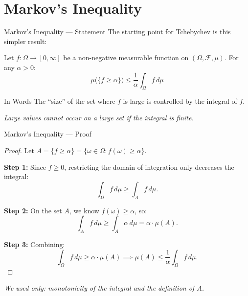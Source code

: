 \documentclass{beamer}
\begin{document}
\section{Markov's Inequality}

\begin{frame}{Markov's Inequality — Statement}
    The starting point for Tchebychev is this simpler result:

    \begin{theorem}
        Let $f: \Omega \to [0, \infty]$ be a non-negative measurable function on $(\Omega, \mathscr{F}, \mu)$. For any $\alpha > 0$:
        \[
            \boxed{\mu\big(\{f \geq \alpha\}\big) \leq \frac{1}{\alpha} \int_\Omega f \, d\mu}
        \]
    \end{theorem}

    \vspace{0.3cm}
    \begin{alertblock}{In Words}
        The ``size'' of the set where $f$ is large is controlled by the integral of $f$.

        \vspace{0.2cm}
        \textit{Large values cannot occur on a large set if the integral is finite.}
    \end{alertblock}
\end{frame}

\begin{frame}{Markov's Inequality — Proof}
    \begin{proof}
        Let $A = \{f \geq \alpha\} = \{\omega \in \Omega : f(\omega) \geq \alpha\}$.

        \vspace{0.3cm}
        \textbf{Step 1:} Since $f \geq 0$, restricting the domain of integration only decreases the integral:
        \[
            \int_\Omega f \, d\mu \geq \int_A f \, d\mu.
        \]

        \textbf{Step 2:} On the set $A$, we know $f(\omega) \geq \alpha$, so:
        \[
            \int_A f \, d\mu \geq \int_A \alpha \, d\mu = \alpha \cdot \mu(A).
        \]

        \textbf{Step 3:} Combining:
        \[
            \int_\Omega f \, d\mu \geq \alpha \cdot \mu(A) \implies \mu(A) \leq \frac{1}{\alpha}\int_\Omega f \, d\mu.
        \]
    \end{proof}

    \textit{We used only: monotonicity of the integral and the definition of $A$.}
\end{frame}
\end{document}
